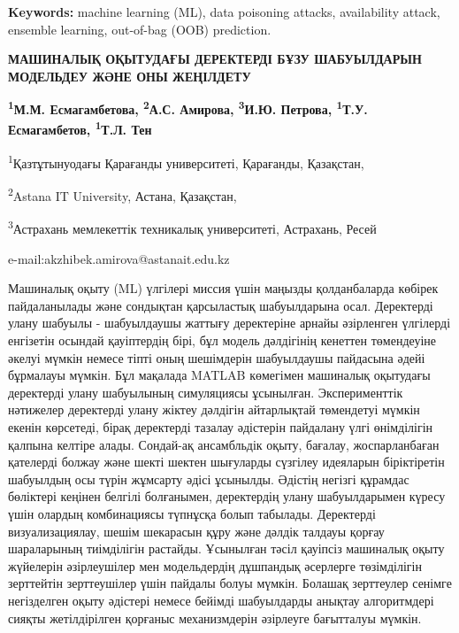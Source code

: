 {\bfseries Keywords:} machine learning (ML), data poisoning attacks,
availability attack, ensemble learning, out-of-bag (OOB) prediction.

\begin{articleheader}
{\bfseries МАШИНАЛЫҚ ОҚЫТУДАҒЫ ДЕРЕКТЕРДІ БҰЗУ ШАБУЫЛДАРЫН МОДЕЛЬДЕУ ЖӘНЕ ОНЫ ЖЕҢІЛДЕТУ}

{\bfseries
\textsuperscript{1}М.М. Есмагамбетова,
\textsuperscript{2}А.С. Амирова\textsuperscript{\envelope },
\textsuperscript{3}И.Ю. Петрова,
\textsuperscript{1}Т.У. Есмагамбетов,
\textsuperscript{1}Т.Л. Тен
}
\end{articleheader}

\begin{affiliation}
\textsuperscript{1}Қазтұтынуодағы Қарағанды университеті, Қарағанды, Қазақстан,

\textsuperscript{2}Astana IT University, Астана, Қазақстан,

\textsuperscript{3}Астрахань мемлекеттік техникалық университеті, Астрахань, Ресей

e-mail:akzhibek.amirova@astanait.edu.kz
\end{affiliation}

Машиналық оқыту (ML) үлгілері миссия үшін маңызды қолданбаларда көбірек
пайдаланылады және сондықтан қарсыластық шабуылдарына осал. Деректерді
улану шабуылы - шабуылдаушы жаттығу деректеріне арнайы әзірленген
үлгілерді енгізетін осындай қауіптердің бірі, бұл модель дәлдігінің
кенеттен төмендеуіне әкелуі мүмкін немесе тіпті оның шешімдерін
шабуылдаушы пайдасына әдейі бұрмалауы мүмкін. Бұл мақалада MATLAB
көмегімен машиналық оқытудағы деректерді улану шабуылының симуляциясы
ұсынылған. Эксперименттік нәтижелер деректерді улану жіктеу дәлдігін
айтарлықтай төмендетуі мүмкін екенін көрсетеді, бірақ деректерді тазалау
әдістерін пайдалану үлгі өнімділігін қалпына келтіре алады. Сондай-ақ
ансамбльдік оқыту, бағалау, жоспарланбаған қателерді болжау және шекті
шектен шығуларды сүзгілеу идеяларын біріктіретін шабуылдың осы түрін
жұмсарту әдісі ұсынылды. Әдістің негізгі құрамдас бөліктері кеңінен
белгілі болғанымен, деректердің улану шабуылдарымен күресу үшін олардың
комбинациясы түпнұсқа болып табылады. Деректерді визуализациялау, шешім
шекарасын құру және дәлдік талдауы қорғау шараларының тиімділігін
растайды. Ұсынылған тәсіл қауіпсіз машиналық оқыту жүйелерін
әзірлеушілер мен модельдердің дұшпандық әсерлерге төзімділігін
зерттейтін зерттеушілер үшін пайдалы болуы мүмкін. Болашақ зерттеулер
сенімге негізделген оқыту әдістері немесе бейімді шабуылдарды анықтау
алгоритмдері сияқты жетілдірілген қорғаныс механизмдерін әзірлеуге
бағытталуы мүмкін.

